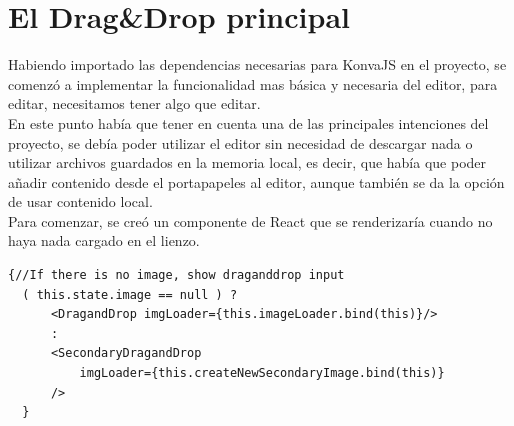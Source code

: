 \section{El Drag\&Drop principal}
Habiendo importado las dependencias necesarias para KonvaJS\cite{KonvaJS} en el proyecto,
se comenzó a implementar la funcionalidad mas básica y necesaria del editor, para editar,
necesitamos tener algo que editar. 
\\
En este punto había que tener en cuenta una de las principales intenciones del proyecto,
se debía poder utilizar el editor sin necesidad de descargar nada o utilizar archivos
guardados en la memoria local, es decir, que había que poder añadir contenido desde 
el portapapeles al editor, aunque también se da la opción de usar contenido local.
\\
Para comenzar, se creó un componente de React que se renderizaría cuando no haya 
nada cargado en el lienzo.

\begin{lstlisting}[caption={Renderizado condicional del componente del DragandDrop}]
  {//If there is no image, show draganddrop input
  ( this.state.image == null ) ?
      <DragandDrop imgLoader={this.imageLoader.bind(this)}/> 
      : 
      <SecondaryDragandDrop 
          imgLoader={this.createNewSecondaryImage.bind(this)}
      />
  }
\end{lstlisting}

